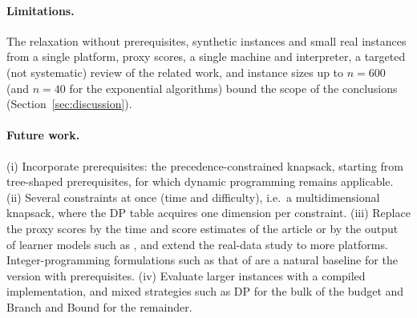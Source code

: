 \paragraph{Limitations.} The relaxation without prerequisites, synthetic instances and small real instances from a single platform, proxy scores, a single machine and interpreter, a targeted (not systematic) review of the related work, and instance sizes up to $n=600$ (and $n=40$ for the exponential algorithms) bound the scope of the conclusions (Section~\ref{sec:discussion}).

\paragraph{Future work.} (i) Incorporate prerequisites: the precedence-constrained knapsack, starting from tree-shaped prerequisites, for which dynamic programming remains applicable. (ii) Several constraints at once (time and difficulty), i.e.\ a multidimensional knapsack, where the DP table acquires one dimension per constraint. (iii) Replace the proxy scores by the time and score estimates of the article \cite{nabizadeh2017rutico,nabizadeh2019uncertainty} or by the output of learner models such as \cite{lv2025genal,yang2026forgetting}, and extend the real-data study to more platforms. Integer-programming formulations such as that of \cite{bose2026learnopt} are a natural baseline for the version with prerequisites. (iv) Evaluate larger instances with a compiled implementation, and mixed strategies such as DP for the bulk of the budget and Branch and Bound for the remainder.
